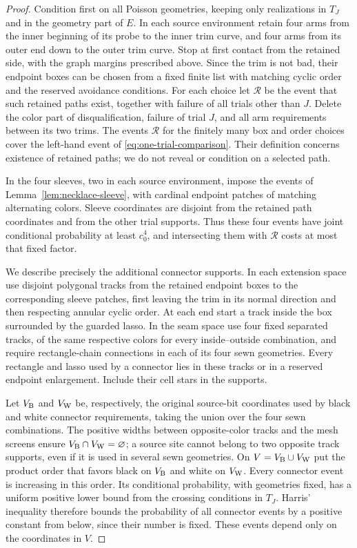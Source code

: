 \begin{proof}
Condition first on all Poisson geometries, keeping only realizations in
$T_J$ and in the geometry part of $E$.  In each source environment retain
four arms from the inner beginning of its probe to the inner trim curve,
and four arms from its outer end down to the outer trim curve.  Stop at
first contact from the retained side, with the graph margins prescribed
above.  Since the trim is not bad, their endpoint boxes can be chosen from
a fixed finite list with matching cyclic order and the reserved avoidance
conditions.  For each choice let $\mathcal R$ be the event that such retained paths
exist, together with failure of all trials other than $J$.  Delete the
color part of disqualification, failure of trial $J$, and all arm
requirements between its two trims.  The events $\mathcal R$ for the finitely many
box and order choices cover the left-hand event of
\eqref{eq:one-trial-comparison}.  Their definition concerns existence of
retained paths; we do not reveal or condition on a selected path.

In the four sleeves, two in each source environment, impose the events
of Lemma~\ref{lem:necklace-sleeve}, with cardinal endpoint patches of
matching alternating colors.  Sleeve coordinates are disjoint from the
retained path coordinates and from the other trial supports.  Thus these
four events have joint conditional probability at least $c_0^4$, and
intersecting them with $\mathcal R$ costs at most that fixed factor.

We describe precisely the additional connector supports.  In each
extension space use disjoint polygonal tracks from the retained endpoint
boxes to the corresponding sleeve patches, first leaving the trim in its
normal direction and then respecting annular cyclic order.  At each end
start a track inside the box surrounded by the guarded lasso.  In the
seam space use four fixed separated tracks, of the same respective
colors for every inside--outside combination, and require rectangle-chain
connections in each of its four sewn geometries.  Every rectangle and
lasso used by a connector lies in these tracks or in a reserved endpoint
enlargement.  Include their cell stars in the supports.

Let $V_{\rm B}$ and $V_{\rm W}$ be, respectively, the original source-bit
coordinates used by black and white connector requirements, taking the
union over the four sewn combinations.  The positive widths between
opposite-color tracks and the mesh screens ensure
$V_{\rm B}\cap V_{\rm W}=\varnothing$; a source site cannot belong to two
opposite track supports, even if it is used in several sewn geometries.
On $V=V_{\rm B}\cup V_{\rm W}$ put the product order that favors black
on $V_{\rm B}$ and white on $V_{\rm W}$.  Every connector event is
increasing in this order.  Its conditional probability, with geometries
fixed, has a uniform positive lower bound from the crossing conditions
in $T_J$.  Harris' inequality therefore bounds the probability of all
connector events by a positive constant from below, since their number
is fixed.  These events depend only on the coordinates in $V$.


\end{proof}
